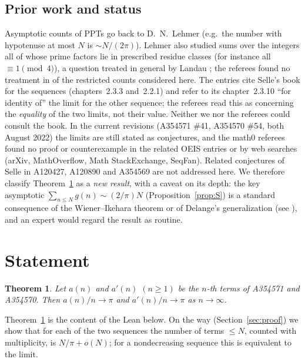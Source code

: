 \documentclass[11pt]{amsart}
\theoremstyle{plain}
\newtheorem{theorem}{Theorem}
\theoremstyle{definition}
\begin{document}
\subsection*{Prior work and status}
Asymptotic counts of PPTs go back to D.~N.~Lehmer \cite{Leh} (e.g.\ the number with hypotenuse at most $N$ is $\sim N/(2\pi)$). Lehmer also studied sums over the integers all of whose prime factors lie in prescribed residue classes (for instance all $\equiv1\pmod4$), a question treated in general by Landau \cite{La}; the referees found no treatment in \cite{Leh} of the restricted counts considered here. The entries cite Selle's book \cite{Se} for the sequences (chapters~2.3.3 and~2.2.1) and refer to its chapter~2.3.10 ``for identity of'' the limit for the other sequence; the referees read this as concerning the \emph{equality} of the two limits, not their value. Neither we nor the referees could consult the book. In the current revisions (A354571 \#41, A354570 \#54, both August 2022) the limits are still stated as conjectures, and the math0 referees found no proof or counterexample in the related OEIS entries or by web searches (arXiv, MathOverflow, Math StackExchange, SeqFan). Related conjectures of Selle in A120427, A120890 and A354569 are not addressed here. We therefore classify Theorem~\ref{thm:main} as a \emph{new result}, with a caveat on its depth: the key asymptotic $\sum_{n\le N}g(n)\sim(2/\pi)N$ (Proposition~\ref{prop:S}) is a standard consequence of the Wiener--Ikehara theorem \cite{Ik,Wi} or of Delange's generalization \cite{De} (see \cite{Ko}), and an expert would regard the result as routine.

\section{Statement}\label{sec:statement}

\begin{theorem}\label{thm:main}
Let $a(n)$ and $a'(n)$ $(n\ge1)$ be the $n$-th terms of A354571 and A354570. Then $a(n)/n\to\pi$ and $a'(n)/n\to\pi$ as $n\to\infty$.
\end{theorem}

Theorem~\ref{thm:main} is the content of the Lean  below. On the way (Section~\ref{sec:proof}) we show that for each of the two sequences the number of terms $\le N$, counted with multiplicity, is $N/\pi+o(N)$; for a nondecreasing sequence this is equivalent to the limit.
\end{document}
